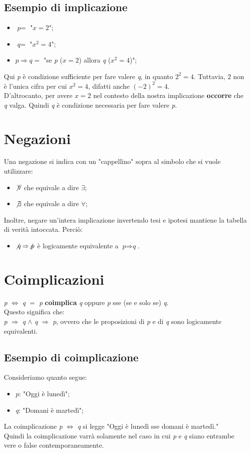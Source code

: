 \documentclass[12pt]{article}
\begin{document}
\subsection{Esempio di implicazione}
\begin{itemize}
    \item $\textit{p} =$ "$x = 2$";
    \item $\textit{q} =$ "$x^2 = 4$";
    \item $\textit{p} \Rightarrow \textit{q} =$ "se \textit{p} ($x=2$) allora \textit{q} ($x^2=4$)";
\end{itemize}
Qui \textit{p} è condizione sufficiente per fare valere \textit{q}, in quanto $2^2=4$. Tuttavia, $2$ non è l'unica cifra per cui $x^2=4$, difatti anche $(-2)^2=4$.\\
D'altrocanto, per avere $x=2$ nel contesto della nostra implicazione \textbf{occorre} che \textit{q} valga. Quindi \textit{q} è condizione necessaria per fare valere \textit{p}.
\section{Negazioni}
Una negazione si indica con un "cappellino" sopra al simbolo che si vuole utilizzare:
\begin{itemize}
    \item $\not\forall$ che equivale a dire $\exists$;
    \item $\not\exists$ che equivale a dire $\forall$;
\end{itemize}
Inoltre, negare un'intera implicazione invertendo tesi e ipotesi mantiene la tabella di verità intoccata. Perciò:
\begin{itemize}
    \item $\not\textit{q} \Rightarrow \not\textit{p}$ è logicamente equivalente a $\textit{p} \Rightarrow \textit{q}$.
\end{itemize}
\section{Coimplicazioni}
\textit{p} $\Leftrightarrow$ \textit{q} $=$ \textit{p} \textbf{coimplica} \textit{q} oppure \textit{p} sse (se e solo se) \textit{q}.\\
Questo significa che:\\
\textit{p} $\Rightarrow$ \textit{q} $\land$ \textit{q} $\Rightarrow$ \textit{p}, ovvero che le proposizioni di \textit{p} e di \textit{q} sono logicamente equivalenti.
\subsection{Esempio di coimplicazione}
Consideriamo quanto segue:
\begin{itemize}
    \item \textit{p}: "Oggi è lunedì";
    \item \textit{q}: "Domani è martedì";
\end{itemize}
La coimplicazione \textit{p} $\Leftrightarrow$ \textit{q} si legge "Oggi è lunedì sse domani è martedì."\\
Quindi la coimplicazione varrà solamente nel caso in cui \textit{p} e \textit{q} siano entrambe vere o false contemporaneamente.
\end{document}
